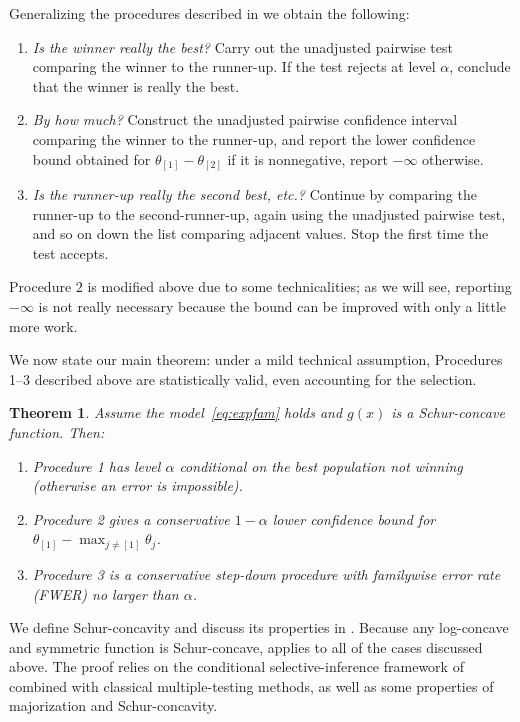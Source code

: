 \documentclass[11pt]{article}
\newtheorem{theorem}[corollary]{Theorem}
\theoremstyle{definition}
\theoremstyle{custom}
\begin{document}
Generalizing the procedures described in  we obtain the following:
\begin{enumerate}
\item {\em Is the winner really the best?} Carry out the unadjusted pairwise test comparing the winner to the runner-up. If the test rejects at level $\alpha$, conclude that the winner is really the best.
\item {\em By how much?} Construct the unadjusted pairwise confidence interval comparing the winner to the runner-up, and report the lower confidence bound obtained for $\theta_{[1]}-\theta_{[2]}$ if it is nonnegative, report $-\infty$ otherwise.
\item {\em Is the runner-up really the second best, etc.?} Continue by comparing the runner-up to the second-runner-up, again using the unadjusted pairwise test, and so on down the list comparing adjacent values. Stop the first time the test accepts.
\end{enumerate}
Procedure $2$ is modified above due to some technicalities; as we will see, reporting $-\infty$ is not really necessary because the bound can be improved with only a little more work.

We now state our main theorem: under a mild technical assumption, Procedures 1--3 described above are statistically valid, even accounting for the selection.
\begin{theorem}
Assume the model~\eqref{eq:expfam} holds and $g\left(x\right)$ is a Schur-concave function. Then:
\begin{enumerate}
\item Procedure 1 has level $\alpha$ conditional on the best population not winning (otherwise an error is impossible).
\item Procedure 2 gives a conservative $1-\alpha$ lower confidence bound for $\theta_{[1]} - \max_{j \ne [1]} \theta_{j}$.
\item Procedure 3 is a conservative step-down procedure with familywise error rate (FWER) no larger than $\alpha$.
\end{enumerate}
\label{thm:main}
\end{theorem}

We define Schur-concavity and discuss its properties in . Because any log-concave and symmetric function is Schur-concave,  applies to all of the cases discussed above. The proof relies on the conditional selective-inference framework of \citet{Fithian:2014ws} combined with classical multiple-testing methods, as well as some properties of majorization and Schur-concavity.
\end{document}
